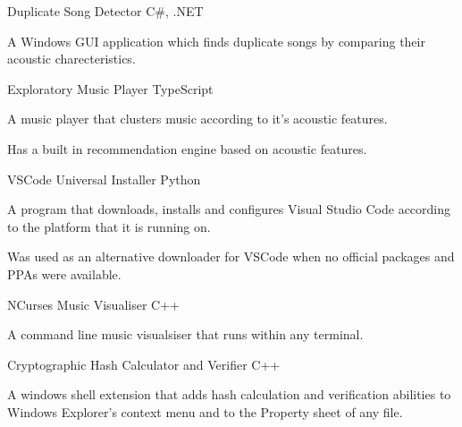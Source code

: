 \begin{projentries}
\projentry%
  {Duplicate Song Detector} %
  {C\#, .NET} %
  {} %
  {%
    \begin{projitems} %
      \item{A Windows GUI application which finds duplicate songs by comparing
            their acoustic charecteristics.}
    \end{projitems}
  }

\projentry%
  {Exploratory Music Player} %
  {TypeScript} %
  {} %
  {%
    \begin{projitems} %
      \item{A music player that clusters music according to it's acoustic
            features.}
      \item{Has a built in recommendation engine based on acoustic features.}
    \end{projitems}
  }

\projentry%
  {VSCode Universal Installer} %
  {Python} %
  {} %
  {%
    \begin{projitems} %
      \item{A program that downloads, installs and configures Visual Studio
            Code according to the platform that it is running on.}
      \item{Was used as an alternative downloader for VSCode when no official
            packages and PPAs were available.}
    \end{projitems}
  }

\projentry%
  {NCurses Music Visualiser} %
  {C++} %
  {} %
  {%
    \begin{projitems} %
      \item{A command line music visualsiser that runs within any terminal.}
    \end{projitems}
  }

\projentry%
  {Cryptographic Hash Calculator and Verifier} %
  {C++} %
  {} %
  {%
    \begin{projitems} %
      \item{A windows shell extension that adds hash calculation and
            verification abilities to Windows Explorer's context menu and to
            the Property sheet of any file.}
    \end{projitems}
  }


\end{projentries}
